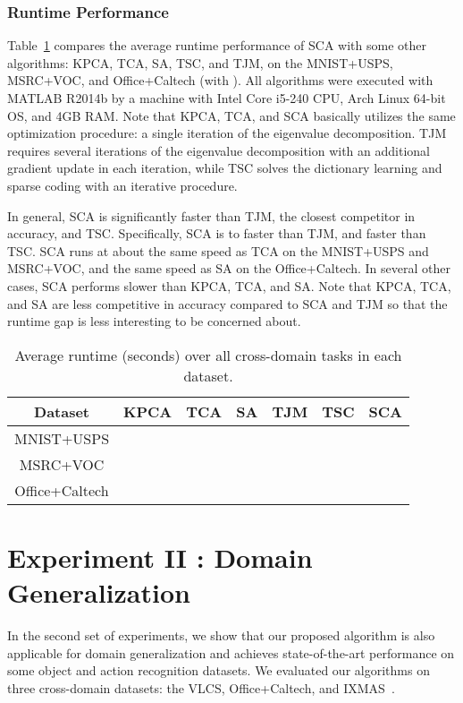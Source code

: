\documentclass[10pt,journal,compsoc]{IEEEtran}
\begin{document}
\subsubsection{Runtime Performance}
\label{sec:exp1_runtime}
Table~\ref{tab:runtime} compares the average runtime performance of SCA with some other algorithms: KPCA, TCA, SA, TSC, and TJM, on the MNIST+USPS, MSRC+VOC, and Office+Caltech (with ).
All algorithms were executed with MATLAB R2014b by a machine with Intel Core i5-240 CPU, Arch Linux 64-bit OS, and 4GB RAM.
Note that KPCA, TCA, and SCA basically utilizes the same optimization procedure: a single iteration of the eigenvalue decomposition.
TJM requires several iterations of the eigenvalue decomposition with an additional gradient update in each iteration, 
while TSC solves the dictionary learning and sparse coding with an iterative procedure.

In general, SCA is significantly faster than TJM, the closest competitor in accuracy, and TSC.
Specifically, SCA is  to  faster than TJM, and  faster than TSC.
SCA runs at about the same speed as TCA on the MNIST+USPS and MSRC+VOC, and the same speed as SA on the Office+Caltech.
In several other cases, SCA performs slower than KPCA, TCA, and SA.
Note that KPCA, TCA, and SA are less competitive in accuracy compared to SCA and TJM so that the runtime gap is less interesting to be concerned about.

\vspace{-1em}
\begin{table}[!htb]
	\caption{Average runtime (seconds) over all cross-domain tasks in each dataset.}
	\vspace{-1em}
	\centering
\begin{tabular}{| c || c | c | c  | c | c | c | }
	\hline
	Dataset & KPCA & TCA & SA & TJM & TSC &  SCA \\
	\hline
	MNIST+USPS &  &  &  &  &  &  \\
	MSRC+VOC &  &  &  &  &  &  \\
	Office+Caltech &  &  &  &  &  &  \\
	\hline
	\end{tabular}
\label{tab:runtime}
\end{table}



\vspace{-1em}
\section{Experiment II : Domain Generalization} 
\label{sec:exp2}
In the second set of experiments, we show that our proposed algorithm is also applicable for domain generalization 
and achieves state-of-the-art performance on some object and action recognition datasets.
We evaluated our algorithms on three cross-domain datasets: the  VLCS, Office+Caltech, and IXMAS~\cite{Ixmas2006}.
\end{document}
